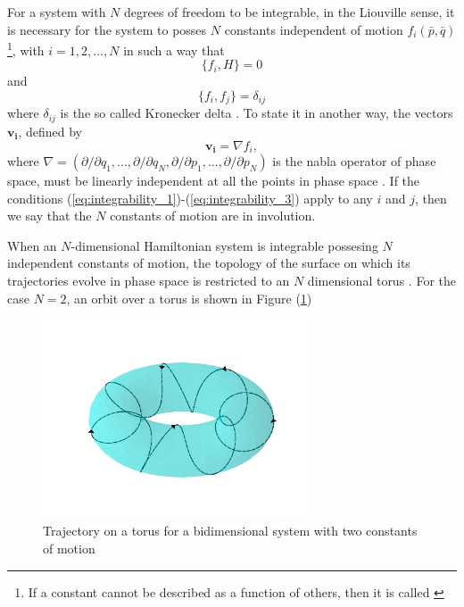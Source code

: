 For a system with $N$ degrees of freedom to be integrable, in the Liouville sense, it is necessary for the system to posses $N$ constants independent of motion $f_i(\bar{p},\bar{q})$\footnote{If a constant cannot be described as a function of others, then it is called  \cite{ott_chaos_2002}}, with $i=1,2,...,N$ in such a way that
\begin{equation}
\{f_i,H\}=0
\label{eq:integrability_1}
\end{equation}
and 
\begin{equation}
\{f_i,f_j\}=\delta_{ij}
\label{eq:integrability_2}
\end{equation}
where $\delta_{ij}$ is the so called Kronecker delta \cite{zaslavsky2005hamiltonian}. To state it in another way, the vectors $\bm{v_i}$, defined by
\begin{equation}
\bm{v_i}=\nabla f_i,
\label{eq:integrability_3}
\end{equation}
where $\nabla=(\partial/\partial q_1,...,\partial/\partial q_N,\partial/\partial p_1,...,\partial/\partial p_N)$ is the nabla operator of phase space, must be linearly independent at all the points in phase space  \cite{goldstein2002classical}. If the conditions (\ref{eq:integrability_1})-(\ref{eq:integrability_3}) apply to any $i$ and $j$, then we say that the $N$ constants of motion are in involution.\par 

When an $N$-dimensional Hamiltonian system is integrable possesing $N$ independent constants of motion, the topology of the surface on which its trajectories evolve in phase space is restricted to an $N$ dimensional torus \cite{zaslavsky2005hamiltonian}. For the case $N=2$, an orbit over a torus is shown in Figure (\ref{fig:trajectory_torus})

\begin{figure}[H]
\centering
\includegraphics[width=0.7\textwidth]{Figures/trajectory_torus.png}
\caption{Trajectory on a torus for a bidimensional system with two constants of motion}
\label{fig:trajectory_torus}
\end{figure}

